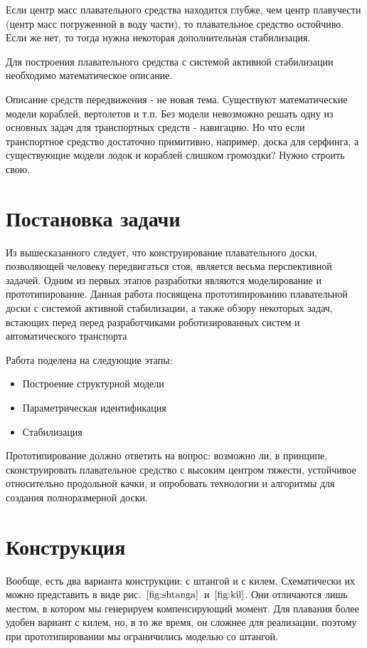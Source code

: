 \documentclass[a4paper]{article}
\begin{document}
Если центр масс плавательного средства находится глубже, чем центр плавучести (центр масс погруженной в воду части), то плавательное средство остойчиво. Если же нет, то тогда нужна некоторая дополнительная стабилизация.

Для построения плавательного средства с системой активной стабилизации необходимо математическое описание.

Описание средств передвижения - не новая тема. Существуют математические модели кораблей, вертолетов и т.п. Без модели невозможно решать одну из основных задач для транспортных средств - навигацию. Но что если транспортное средство достаточно примитивно, например, доска для серфинга, а существующие модели лодок и кораблей слишком громоздки? Нужно строить свою.


\section{Постановка задачи}

Из вышесказанного следует, что конструирование плавательного доски, позволяющей человеку передвигаться стоя, является весьма перспективной задачей. Одним из первых этапов разработки являются моделирование и прототипирование. Данная работа посвящена прототипированию плавательной доски с системой активной стабилизации, а также обзору некоторых задач, встающих перед перед разработчиками роботизированных систем и автоматического транспорта

Работа поделена на следующие этапы:

\begin{itemize}
	\item Построение структурной модели
	\item Параметрическая идентификация
	\item Стабилизация
\end{itemize}

Прототипирование должно ответить на вопрос: возможно ли, в принципе, сконструировать плавательное средство с высоким центром тяжести, устойчивое относительно продольной качки, и опробовать технологии и алгоритмы для создания полноразмерной доски.

\section{Конструкция}

Вообще, есть два варианта конструкции: с штангой и с килем. Схематически их можно представить в виде рис.~$\ref{fig:shtanga}$~и~$\ref{fig:kil}$. Они отличаются лишь местом, в котором мы генерируем компенсирующий момент. Для плавания более удобен вариант с килем, но, в то же время, он сложнее для реализации, поэтому при прототипировании мы ограничились моделью со штангой.
\end{document}
